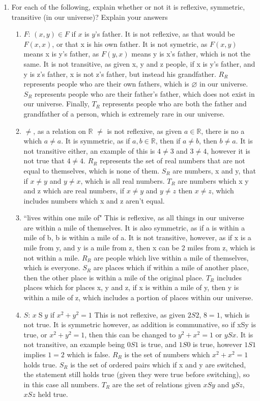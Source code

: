 \documentclass[11pt]{letter}
\theoremstyle{definition}
\begin{document}
\begin{description}
\begin{enumerate}
                          
			
			\item For each of the following, explain whether or not it is reflexive, symmetric, transitive (in our universe)? Explain your answers
				\begin{enumerate}
					\item $F$: $(x,y)\in F$ if $x$ is $y$'s father. It is not reflexive, as that would be $F(x,x)$, or that x is his own father. It is not symetric, as $F(x,y)$ means x is y's father, as $F(y,x)$ means y is x's father, which is not the same. It is not transitive, as given x, y and z people, if x is y's father, and y is z's father, x is not z's father, but instead his grandfather. $R_R$ represents people who are their own fathers, which is $\varnothing$ in our universe. $S_R$ represents people who are their father's father, which does not exist in our universe. Finally, $T_R$ represents people who are both the father and grandfather of a person, which is extremely rare in our universe. 
					\item $\neq$, as a relation on $\mathbb{R}$ $\neq$ is not reflexive, as given $a \in \mathbb{R}$, there is no a which $a\neq a$. It is symmetric, as if $a,b\in \mathbb{R}$, then if $a\neq b$, then $b\neq a$. It is not transitive either, an example of this is $4\neq 3$ and $3\neq 4$, however it is not true that $4\neq 4$. $R_R$ represents the set of real numbers that are not equal to themselves, which is none of them. $S_R$ are numbers, x and y, that if $x\neq y$ and $y\neq x$, which is all real numbers. $T_R$ are numbers which x y and z which are real numbers, if $x\neq y$ and $y\neq z$ then $x\neq z$, which includes numbers which x and z aren't equal.
					\item ``lives within one mile of" This is reflexive, as all things in our universe are within a mile of themselves. It is also symmetric, as if a is within a mile of b, b is within a mile of a. It is not transitive, however, as if x is a mile from y, and y is a mile from z, then x can be 2 miles from z, which is not within a mile. $R_R$ are people which live within a mile of themselves, which is everyone. $S_R$ are places which if within a mile of another place, then the other place is within a mile of the original place. $T_R$ includes places which for places x, y and z, if x is within a mile of y, then y is within a mile of z, which includes a portion of places within our universe.
					\item $S$: $x\operatorname{S} y$ if $x^2+y^2=1$ This is not reflexive, as given $2S2$, $8=1$, which is not true. It is symmetric however, as addition is communative, so if xSy is true, or $x^2+y^2=1$, then this can be changed to $y^2+x^2=1$ or $ySx$. It is not transitive, an example being $0S1$ is true, and $1S0$ is true, however $1S1$ implies $1=2$ which is false. $R_R$ is the set of numbers which $x^2+x^2=1$ holds true. $S_R$ is the set of ordered pairs which if x and y are switched, the statement still holds true (given they were true before switching), so in this case all numbers. $T_R$ are the set of relations given $xSy$ and $ySz$, $xSz$ held true. 
				\end{enumerate}
				

\end{enumerate}
\end{description}
\end{document}
